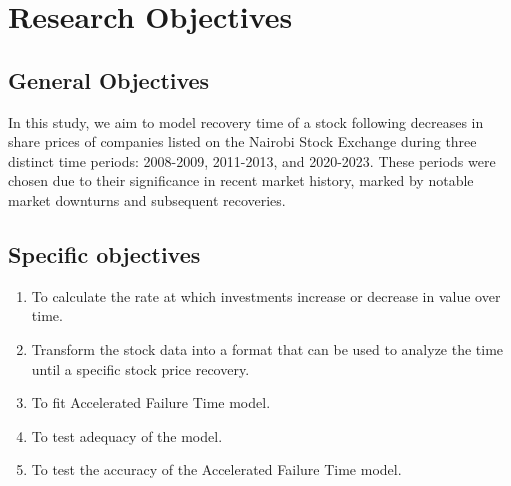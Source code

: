 \documentclass[twoside,a4paper,12pt]{article}
\begin{document}
\section*{Research Objectives} 
\subsection*{General Objectives}In this study, we aim to model  recovery time of a stock following decreases in share prices of companies listed on the Nairobi Stock Exchange during three distinct time periods: 2008-2009, 2011-2013, and 2020-2023. These periods were chosen due to their significance in recent market history, marked by notable market downturns and subsequent recoveries.
\subsection*{Specific objectives}
\begin{enumerate}

	\item To calculate the rate at which investments increase or decrease in value over time.
	\item Transform the stock data into a format that can be used to analyze the time until a specific stock price recovery.
	\item To fit   Accelerated Failure Time model.
	\item  To test adequacy of the model.
	\item To test the accuracy of the Accelerated Failure Time model.

	
	

\end{enumerate}	
\end{document}
